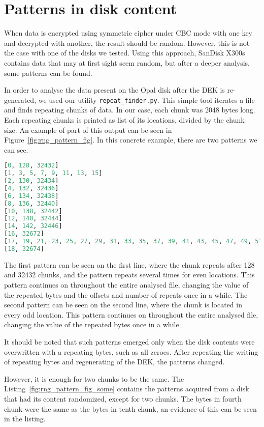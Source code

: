 \chapter{Patterns in disk content}
\label{appendix:rng_pattern}

When data is encrypted using symmetric cipher under CBC mode with one key and decrypted with another, the result should be random.
However, this is not the case with one of the disks we tested. Using this approach, SanDisk X300s contains data that may at first sight seem random, but after a deeper analysis, some patterns can be found.

In order to analyse the data present on the Opal disk after the DEK is re-generated, we used our utility \verb|repeat_finder.py|. This simple tool iterates a file and finds repeating chunks of data. In our case, each chunk was 2048 bytes long. Each repeating chunks is printed as list of its locations, divided by the chunk size. An example of part of this output can be seen in Figure~\ref{fig:rng_pattern_fig}. In this concrete example, there are two patterns we can see.

\begin{lstlisting}[caption={Found patterns on zeroed disk},label={fig:rng_pattern_fig},language=Python]
[0, 128, 32432]
[1, 3, 5, 7, 9, 11, 13, 15]
[2, 130, 32434]
[4, 132, 32436]
[6, 134, 32438]
[8, 136, 32440]
[10, 138, 32442]
[12, 140, 32444]
[14, 142, 32446]
[16, 32672]
[17, 19, 21, 23, 25, 27, 29, 31, 33, 35, 37, 39, 41, 43, 45, 47, 49, 51, 53, 55]
[18, 32674]
    \end{lstlisting}
The first pattern can be seen on the first line, where the chunk repeats after 128 and 32432 chunks, and the pattern repeats several times for even locations. This pattern continues on throughout the entire analysed file, changing the value of the repeated bytes and the offsets and number of  repeats  once in a while.
The second pattern can be seen on the second line, where the chunk is located in every odd location. This pattern continues on throughout the entire analysed file, changing the value of the repeated bytes once in a while.

It should be noted that such patterns emerged only when the disk contents were overwritten with a repeating bytes, such as all zeroes. After repeating the writing of repeating bytes and regenerating of the DEK, the patterns changed. 

However, it is enough for two chunks to be the same. The Listing~\ref{fig:rng_pattern_fig_some} contains the patterns acquired from a disk that had its content randomized, except for two chunks. The bytes in fourth chunk were the same as the bytes in tenth chunk, an evidence of this can be seen in the listing.

